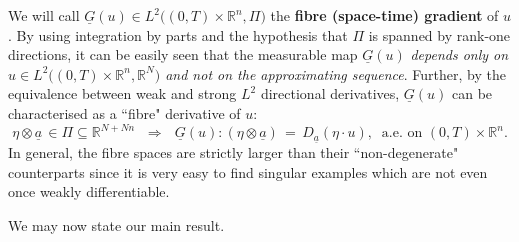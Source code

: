 \documentclass{amsart}
\theoremstyle{definition}
\numberwithin{equation}{section}
\begin{document}
We will call $\underline{G} (u) \in L^2\big((0,T)\!{\times}\! {\mathbb{R}}^n,\Pi\big)$ the \textbf{fibre (space-time) gradient} of $u$. By using integration by parts and the hypothesis that $\Pi$ is spanned by rank-one directions, it can be easily seen that the measurable map $\underline{G} (u)$ \emph{depends only on $u \in L^2\big((0,T)\!{\times}\! {\mathbb{R}}^n,{\mathbb{R}}^N\big)$ and not on the approximating sequence}. Further, by the  equivalence between weak and strong $L^2$ directional derivatives, $\underline{G} (u)$ can be characterised as a ``fibre" derivative of $u$:
\[
\eta {\otimes} \underline{a} \, \in  \Pi{\subseteq} {\mathbb{R}}^{N+Nn} \ \ \, \Longrightarrow \ \ \ \underline{G} (u) : (\eta {\otimes} \underline{a} )\, =\, D_{\underline{a}} (\eta \cdot u), \ \text{ a.e.\ on }(0,T){\times} {\mathbb{R}}^n.
\]
In general, the fibre spaces are strictly larger than their ``non-degenerate" counterparts since it is very easy to find singular examples which are not even once weakly differentiable. 

We may now state our main result. 
\end{document}
